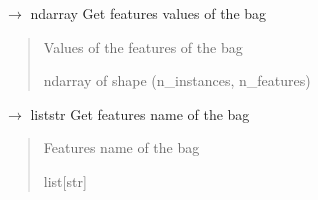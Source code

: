\documentclass[letterpaper,10pt,english]{sphinxmanual}
\begin{document}
\begin{fulllineitems}
\begin{fulllineitems}
\begin{quote}
\begin{description}
\end{description}\end{quote}

\end{fulllineitems}


\begin{fulllineitems}
\label{\detokenize{data/_autosummary/miml.data.bag.Bag:miml.data.bag.Bag.get_features}}
\pysigstartsignatures
\pysiglinewithargsret
{}
{}
{{ $\rightarrow$ ndarray}}
\pysigstopsignatures
\sphinxAtStartPar
Get features values of the bag
\begin{quote}\begin{description}
\sphinxAtStartPar
{} \textendash{} Values of the features of the bag

\sphinxAtStartPar
ndarray of shape (n\_instances, n\_features)

\end{description}\end{quote}

\end{fulllineitems}


\begin{fulllineitems}
\label{\detokenize{data/_autosummary/miml.data.bag.Bag:miml.data.bag.Bag.get_features_name}}
\pysigstartsignatures
\pysiglinewithargsret
{}
{}
{{ $\rightarrow$ list\DUrole{p}{{[}}str\DUrole{p}{{]}}}}
\pysigstopsignatures
\sphinxAtStartPar
Get features name of the bag
\begin{quote}\begin{description}
\sphinxAtStartPar
{} \textendash{} Features name of the bag

\sphinxAtStartPar
list{[}str{]}

\end{description}\end{quote}

\end{fulllineitems}


\end{fulllineitems}
\end{document}
